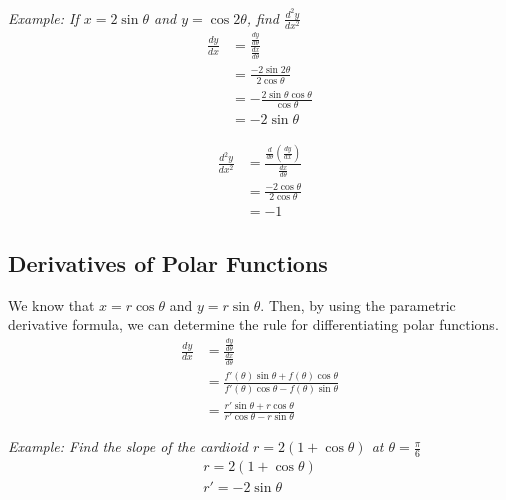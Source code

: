         \noindent \color{blue} \textit{Example: If $x=2\sin{\theta}$ and $y=\cos{2\theta}$,
        find $\frac{d^2y}{dx^2}$} \color{black} \\

        \begin{align*}
            \frac{dy}{dx} &= \frac{\frac{dy}{d\theta}}{\frac{dx}{d\theta}} \\
            &= \frac{-2\sin{2\theta}}{2\cos{\theta}} \\
            &= -\frac{2\sin\theta\cos\theta}{\cos\theta} \\
            &= -2\sin\theta
        \end{align*}

        \begin{align*}
            \frac{d^2y}{dx^2} &= \frac{\frac{d}{d\theta}\left(\frac{dy}{dx}\right)}{\frac{dx}{d\theta}} \\
            &= \frac{-2\cos\theta}{2\cos\theta} \\
            &= -1
        \end{align*}



    \subsection{Derivatives of Polar Functions}
        We know that $x=r\cos\theta$ and $y=r\sin\theta$. Then, by using the parametric derivative
        formula, we can determine the rule for differentiating polar functions. \\

        \begin{align*}
            \frac{dy}{dx} &= \frac{\frac{dy}{d\theta}}{\frac{dx}{d\theta}} \\
            &= \frac{f'(\theta)\sin\theta+f(\theta)\cos\theta}{f'(\theta)\cos\theta-f(\theta)\sin\theta} \\
            &= \frac{r'\sin\theta+r\cos\theta}{r'\cos\theta-r\sin\theta}
        \end{align*}

        \noindent \color{blue} \textit{Example: Find the slope of the cardioid
        $r=2(1+\cos\theta)$ at $\theta=\frac{\pi}{6}$} \color{black} \\

        \begin{align*}
            r=2(1+\cos\theta) \\
            r' = -2\sin\theta
        \end{align*}

